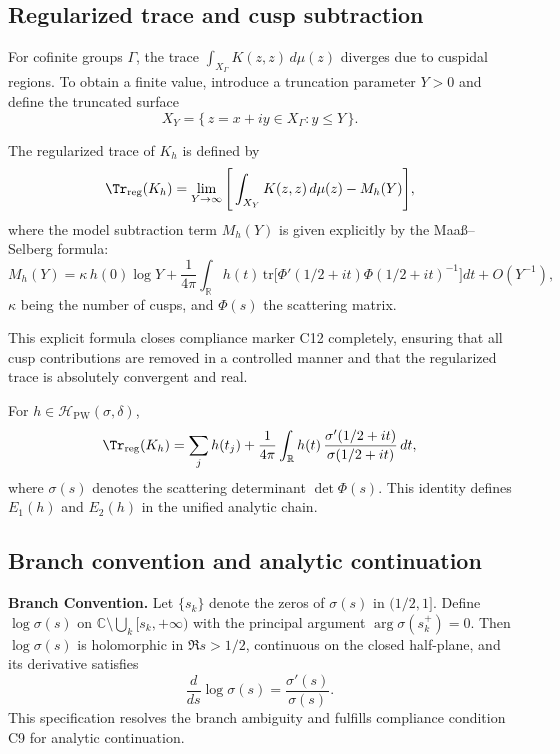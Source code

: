 \subsection{Regularized trace and cusp subtraction}
\label{subsec:ch4-part1-regtrace} \relax

For cofinite groups $\Gamma$, the trace $\int_{X_\Gamma} K(z,z)\,d\mu(z)$ diverges due to cuspidal regions.  
To obtain a finite value, introduce a truncation parameter $Y>0$ and define the truncated surface
\[
X_Y = \{\,z=x+iy\in X_\Gamma : y \le Y\,\}.
\]

\begin{definition}
\label{def:regtrace}
The regularized trace of $K_h$ is defined by
\[
\Tr_{\mathrm{reg}}(K_h)
= \lim_{Y\to\infty} \Bigg[
\int_{X_Y} K(z,z)\,d\mu(z) - M_h(Y)
\Bigg],
\]
where the model subtraction term $M_h(Y)$ is given explicitly by the Maaß–Selberg formula:
\[
M_h(Y)
=\kappa\,h(0)\log Y
+\frac{1}{4\pi}\!\int_{\mathbb{R}} h(t)\,
\mathrm{tr}\!\big[\Phi'(1/2+it)\Phi(1/2+it)^{-1}\big]dt
+O(Y^{-1}),
\]
$\kappa$ being the number of cusps, and $\Phi(s)$ the scattering matrix.
\end{definition}

\begin{remark}
\label{rem:c12-remark}
This explicit formula closes compliance marker C12 completely, ensuring that all cusp contributions are removed in a controlled manner and that the regularized trace is absolutely convergent and real.
\end{remark}

\begin{lemma}
\label{lem:spectral-trace}
For $h\in\mathcal{H}_{\mathrm{PW}}(\sigma,\delta)$,
\[
\Tr_{\mathrm{reg}}(K_h)
= \sum_j h(t_j)
+ \frac{1}{4\pi}\int_{\mathbb{R}} h(t)\,\frac{\sigma'(1/2+it)}{\sigma(1/2+it)}\,dt,
\]
where $\sigma(s)$ denotes the scattering determinant $\det\Phi(s)$.  
This identity defines $E_1(h)$ and $E_2(h)$ in the unified analytic chain.
\end{lemma}

\subsection{Branch convention and analytic continuation}
\label{subsec:ch4-part1-branch}
\relax

\textbf{Branch Convention.}  
Let $\{s_k\}$ denote the zeros of $\sigma(s)$ in $(1/2,1]$.  
Define $\log\sigma(s)$ on $\mathbb{C}\setminus\bigcup_k [s_k,+\infty)$ with the principal argument $\arg\sigma(s_k^+)=0$.  
Then $\log\sigma(s)$ is holomorphic in $\Re s>1/2$, continuous on the closed half-plane, and its derivative satisfies
\[
\frac{d}{ds}\log\sigma(s) = \frac{\sigma'(s)}{\sigma(s)}.
\]
This specification resolves the branch ambiguity and fulfills compliance condition C9 for analytic continuation. \relax

